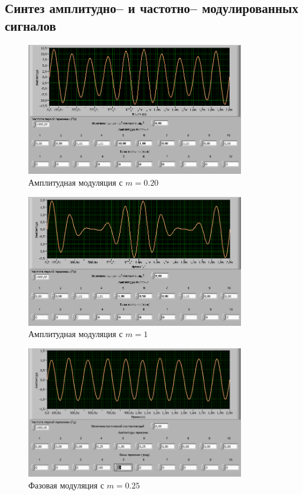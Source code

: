 \subsection{Синтез амплитудно-- и частотно-- модулированных сигналов}
\begin{figure}[H]
	\centering
	\includegraphics[width=0.85\textwidth]{pic/mod/mod2.png}
	\caption{Амплитудная модуляция с $m=0.20$}
\end{figure}
\begin{figure}[H]
	\centering
	\includegraphics[width=0.85\textwidth]{pic/mod/mod1.png}
	\caption{Амплитудная модуляция с $m=1$}
\end{figure}
\begin{figure}[H]
	\centering
	\includegraphics[width=0.85\textwidth]{pic/mod/mod3.png}
	\caption{Фазовая модуляция с  $m=0.25$}
\end{figure}
